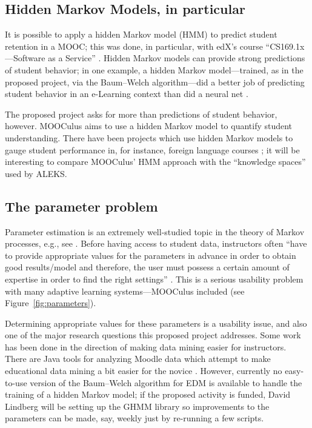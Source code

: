\documentclass[12pt]{article}
\begin{document}
\subsection{Hidden Markov Models, in particular}

It is possible to apply a hidden Markov model (HMM) to predict student
retention in a MOOC; this was done, in particular, with edX's course
``CS169.1x---Software as a
Service'' \parencite{balakrishnan2013predicting}.  Hidden Markov
models can provide strong predictions of student behavior; in one
example, a hidden Markov model---trained, as in the proposed project,
via the Baum--Welch algorithm---did a better job of predicting student
behavior in an e-Learning context than did a neural
net \parencite{anari2012intelligent}.

The proposed project asks for more than predictions of student
behavior, however.  MOOCulus aims to use a hidden Markov model to
quantify student understanding.  There have been projects which use
hidden Markov models to gauge student performance in, for instance,
foreign language courses \parencite{khan2013automatic}; it will be
interesting to compare MOOCulus' HMM approach with the ``knowledge
spaces'' \parencite{albert1999knowledge} used by ALEKS.

\subsection{The parameter problem}

Parameter estimation is an extremely well-studied topic in the theory
of Markov processes, e.g., see \parencite{MR0202264,MR0123419}.
Before having access to student data, instructors often ``have to
provide appropriate values for the parameters in advance in order to
obtain good results/model and therefore, the user must possess a
certain amount of expertise in order to find the right
settings'' \parencite{romero2010educational}.  This is a serious
usability problem with many adaptive learning systems---MOOCulus
included (see Figure~\ref{fig:parameters}).

Determining appropriate values for these parameters is a usability
issue, and also one of the major research questions this proposed
project addresses.  Some work has been done in the direction of making
data mining easier for instructors. There are Java tools for analyzing
Moodle data which attempt to make educational data mining a bit easier
for the novice \parencite{java-data-mining}.  However, currently no
easy-to-use version of the Baum--Welch algorithm for EDM is available
to handle the training of a hidden Markov model; if the proposed
activity is funded, David Lindberg will be setting up the GHMM library
\parencite{ghmm} so improvements to the parameters can be made, say,
weekly just by re-running a few scripts.
\end{document}
